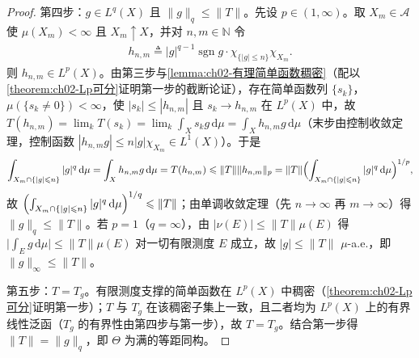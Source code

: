 \documentclass[../../main.tex]{subfiles}%
\begin{document}
\begin{proof}
第四步：$g\in L^q(X)$ 且 $\|g\|_q\leqslant\|T\|$。先设 $p\in(1,\infty)$。取 $X_m\in\mathscr A$ 使 $\mu(X_m)<\infty$ 且 $X_m\uparrow X$，并对 $n,m\in\mathbb N$ 令
\begin{align*}
h_{n,m}\triangleq|g|^{q-1}\operatorname{sgn}g\cdot\chi_{\{|g|\leqslant n\}}\chi_{X_m}.
\end{align*}
则 $h_{n,m}\in L^p(X)$。由第三步与\cref{lemma:ch02-有理简单函数稠密}（配以\cref{theorem:ch02-Lp可分}证明第一步的截断论证），存在简单函数列 $\{s_k\}$，$\mu(\{s_k\neq0\})<\infty$，使 $|s_k|\leqslant|h_{n,m}|$ 且 $s_k\to h_{n,m}$ 在 $L^p(X)$ 中，故 $T(h_{n,m})=\lim_kT(s_k)=\lim_k\int_Xs_kg\,\mathrm{d}\mu=\int_Xh_{n,m}g\,\mathrm{d}\mu$（末步由控制收敛定理，控制函数 $|h_{n,m}g|\leqslant n|g|\chi_{X_m}\in L^1(X)$）。于是
\begin{align*}
\int_{X_m\cap\{|g|\leqslant n\}}|g|^q\,\mathrm{d}\mu=\int_Xh_{n,m}g\,\mathrm{d}\mu=T(h_{n,m})\leqslant\|T\|\|h_{n,m}\|_p=\|T\|\Bigl(\int_{X_m\cap\{|g|\leqslant n\}}|g|^q\,\mathrm{d}\mu\Bigr)^{1/p},
\end{align*}
故 $\Bigl(\int_{X_m\cap\{|g|\leqslant n\}}|g|^q\,\mathrm{d}\mu\Bigr)^{1/q}\leqslant\|T\|$；由单调收敛定理（先 $n\to\infty$ 再 $m\to\infty$）得 $\|g\|_q\leqslant\|T\|$。若 $p=1$（$q=\infty$），由 $|\nu(E)|\leqslant\|T\|\mu(E)$ 得 $\bigl|\int_Eg\,\mathrm{d}\mu\bigr|\leqslant\|T\|\mu(E)$ 对一切有限测度 $E$ 成立，故 $|g|\leqslant\|T\|$ $\mu$-a.e.，即 $\|g\|_\infty\leqslant\|T\|$。

第五步：$T=T_g$。有限测度支撑的简单函数在 $L^p(X)$ 中稠密（\cref{theorem:ch02-Lp可分}证明第一步）；$T$ 与 $T_g$ 在该稠密子集上一致，且二者均为 $L^p(X)$ 上的有界线性泛函（$T_g$ 的有界性由第四步与第一步），故 $T=T_g$。结合第一步得 $\|T\|=\|g\|_q$，即 $\Theta$ 为满的等距同构。
\end{proof}
\end{document}

